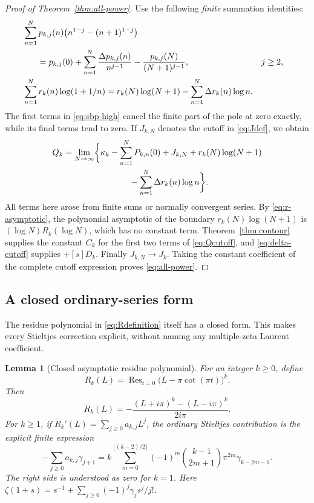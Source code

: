 \documentclass[11pt,a4paper]{article}
\numberwithin{equation}{section}
\newtheorem{lemma}[theorem]{Lemma}
\theoremstyle{definition}
\theoremstyle{remark}
\DeclareMathOperator*{\Res}{Res}
\begin{document}
\begin{proof}[Proof of Theorem~\ref{thm:all-power}]
Use the following \emph{finite} summation identities:
\begin{align}
 &\sum_{n=1}^N p_{k,j}(n)
               \bigl(n^{1-j}-(n+1)^{1-j}\bigr)\notag\\
 &\hspace{6mm}=p_{k,j}(0)+
           \sum_{n=1}^N\frac{\Delta p_{k,j}(n)}{n^{j-1}}
                    -\frac{p_{k,j}(N)}{(N+1)^{j-1}},
                  &&j\ge2,\label{eq:sbp-high}\\
 &\sum_{n=1}^N r_k(n)\log(1+1/n)
     =r_k(N)\log(N+1)-\sum_{n=1}^N\Delta r_k(n)\log n.
 \label{eq:sbp-simple}
\end{align}
The first terms in \eqref{eq:sbp-high} cancel the finite part of
the pole at zero exactly, while its final terms tend to zero.
If $J_{k,N}$ denotes the cutoff in \eqref{eq:Jdef}, we obtain
\begin{align}
 Q_k=\lim_{N\to\infty}\biggl\{
 &\kappa_k-\sum_{n=1}^N P_{k,n}(0)+J_{k,N}
       +r_k(N)\log(N+1)\notag\\
 &\hspace{12mm}-\sum_{n=1}^N\Delta r_k(n)\log n\biggr\}.
 \label{eq:Qcutoff}
\end{align}
All terms here arose from finite sums or normally convergent series.
By \eqref{eq:r-asymptotic}, the polynomial asymptotic of the boundary
$r_k(N)\log(N+1)$ is $(\log N)R_k(\log N)$, which has no constant
term.  Theorem~\ref{thm:contour} supplies the constant $C_k$ for the
first two terms of \eqref{eq:Qcutoff}, and \eqref{eq:delta-cutoff}
supplies $+[s]D_k$.  Finally $J_{k,N}\to J_k$.  Taking the constant
coefficient of the complete cutoff expression proves
\eqref{eq:all-power}.
\end{proof}

\subsection{A closed ordinary-series form}

The residue polynomial in \eqref{eq:Rdefinition} itself has a closed
form.  This makes every Stieltjes correction explicit, without naming
any multiple-zeta Laurent coefficient.

\begin{lemma}[Closed asymptotic residue polynomial]
\label{powers:lem:closed-residue}
For an integer \(k\ge0\), define
\[
 R_k(L)=\Res_{t=0}\bigl(L-\pi\cot(\pi t)\bigr)^k.
\]
Then
\begin{equation}
 \boxed{\displaystyle
 R_k(L)=-\frac{(L+i\pi)^k-(L-i\pi)^k}{2i\pi}.}
 \label{powers:eq:closed-residue}
\end{equation}
For \(k\ge1\), if \(R_k'(L)=\sum_{j\ge0}a_{k,j}L^j\), the
ordinary Stieltjes contribution is the explicit finite expression
\begin{equation}
 \boxed{\displaystyle
 -\sum_{j\ge0}a_{k,j}\gamma_{j+1}
 =k\sum_{m=0}^{\lfloor(k-2)/2\rfloor}
       (-1)^m\binom{k-1}{2m+1}\pi^{2m}\gamma_{k-2m-1}.}
 \label{powers:eq:closed-Stieltjes}
\end{equation}
The right side is understood as zero for \(k=1\). Here
\(\zeta(1+s)=s^{-1}+\sum_{j\ge0}(-1)^j\gamma_j s^j/j!\).
\end{lemma}
\end{document}

